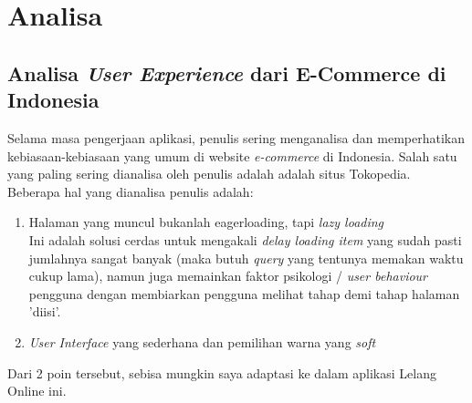 \section{Analisa}

	
	 
	 
	
	
	
	
	
	
	
	
	
	\subsection{Analisa \textit{User Experience} dari E-Commerce di Indonesia}
    \label{alasan-ux-ecommerce-indonesia alasan-app-serupa}
    Selama masa pengerjaan aplikasi, penulis sering menganalisa dan memperhatikan kebiasaan-kebiasaan yang umum di website \textit{e-commerce} di Indonesia. Salah satu yang paling sering dianalisa oleh penulis adalah adalah situs Tokopedia.
    \\
    \indent Beberapa hal yang dianalisa penulis adalah:
    \begin{enumerate}
    \item Halaman yang muncul bukanlah eagerloading, tapi \textit{lazy loading}\\
    \indent Ini adalah solusi cerdas untuk mengakali \textit{delay loading item} yang sudah pasti jumlahnya sangat banyak (maka butuh \textit{query} yang tentunya memakan waktu cukup lama), namun juga memainkan faktor psikologi / \textit{user behaviour} pengguna dengan membiarkan pengguna melihat tahap demi tahap halaman 'diisi'.
    \item \textit{User Interface} yang sederhana dan pemilihan warna yang \textit{soft}
    \end{enumerate}
    Dari 2 poin tersebut, sebisa mungkin saya adaptasi ke dalam aplikasi Lelang Online ini.
    
